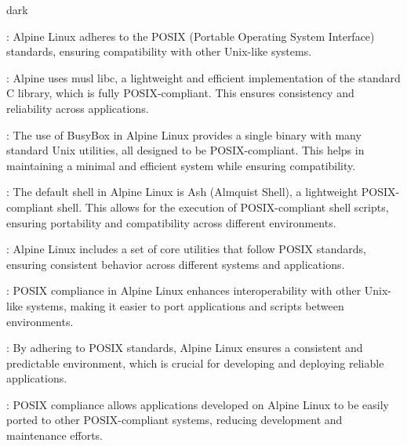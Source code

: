\label{POSIX Compliant Features of Alpine Linux}
\begin{baseBoxThree}{}{dark}
    \begin{posnexItemize}
        \item[\sA] : Alpine Linux adheres to the POSIX (Portable Operating System Interface) standards, ensuring compatibility with other Unix-like systems.
        \item[\sA] : Alpine uses musl libc, a lightweight and efficient implementation of the standard C library, which is fully POSIX-compliant. This ensures consistency and reliability across applications.
        \item[\sA] : The use of BusyBox in Alpine Linux provides a single binary with many standard Unix utilities, all designed to be POSIX-compliant. This helps in maintaining a minimal and efficient system while ensuring compatibility.
        \item[\sA] : The default shell in Alpine Linux is Ash (Almquist Shell), a lightweight POSIX-compliant shell. This allows for the execution of POSIX-compliant shell scripts, ensuring portability and compatibility across different environments.
        \item[\sA] : Alpine Linux includes a set of core utilities that follow POSIX standards, ensuring consistent behavior across different systems and applications.
        \item[\sA] : POSIX compliance in Alpine Linux enhances interoperability with other Unix-like systems, making it easier to port applications and scripts between environments.
        \item[\sA] : By adhering to POSIX standards, Alpine Linux ensures a consistent and predictable environment, which is crucial for developing and deploying reliable applications.
        \item[\sA] : POSIX compliance allows applications developed on Alpine Linux to be easily ported to other POSIX-compliant systems, reducing development and maintenance efforts.
    \end{posnexItemize}
\end{baseBoxThree}
